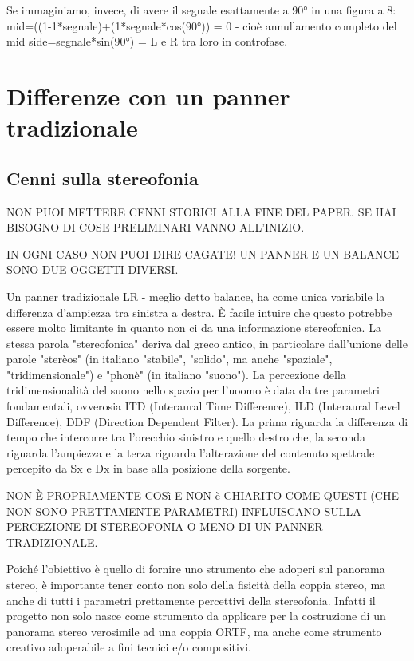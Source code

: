 \documentclass{article}
\begin{document}
    Se immaginiamo, invece, di avere il segnale esattamente a 90° in una figura a 8: \\
    mid=((1-1*segnale)+(1*segnale*cos(90°)) = 0 - cioè annullamento completo del mid side=segnale*sin(90°) = L e R tra loro in controfase.

\section{Differenze con un panner tradizionale}
    \subsection{Cenni sulla stereofonia}
    
    NON PUOI METTERE CENNI STORICI ALLA FINE DEL PAPER. SE HAI BISOGNO DI COSE PRELIMINARI VANNO ALL'INIZIO. 
    
    IN OGNI CASO NON PUOI DIRE CAGATE! UN PANNER E UN BALANCE SONO DUE OGGETTI DIVERSI. 
    
    Un panner tradizionale LR - meglio detto balance, ha come unica variabile la differenza d'ampiezza tra sinistra a destra. È facile intuire che questo potrebbe essere molto limitante in quanto non ci da una informazione stereofonica. La stessa parola "stereofonica" deriva dal greco antico, in particolare dall'unione delle parole "sterèos" (in italiano "stabile", "solido", ma anche "spaziale", "tridimensionale") e "phonè" (in italiano "suono"). La percezione della tridimensionalità del suono nello spazio per l'uoomo è data da tre parametri fondamentali, ovverosia ITD (Interaural Time Difference), ILD (Interaural Level Difference), DDF (Direction Dependent Filter). La prima riguarda la differenza di tempo che intercorre tra l'orecchio sinistro e quello destro che, la seconda riguarda l'ampiezza e la terza riguarda l'alterazione del contenuto spettrale percepito da Sx e Dx in base alla posizione della sorgente.
    
    NON È PROPRIAMENTE COSì E NON è CHIARITO COME QUESTI (CHE NON SONO PRETTAMENTE PARAMETRI) INFLUISCANO SULLA PERCEZIONE DI STEREOFONIA O MENO DI UN PANNER TRADIZIONALE.
    
    Poiché l'obiettivo è quello di fornire uno strumento che adoperi sul panorama stereo, è importante tener conto non solo della fisicità della coppia stereo, ma anche di tutti i parametri prettamente percettivi della stereofonia. Infatti il progetto non solo nasce come strumento da applicare per la costruzione di un panorama stereo verosimile ad una coppia ORTF, ma anche come strumento creativo adoperabile a fini tecnici e/o compositivi.
\end{document}
